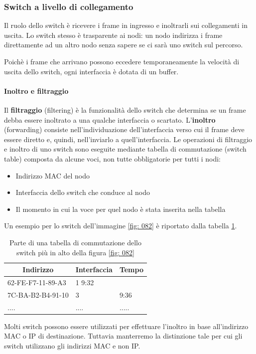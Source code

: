 \documentclass[11pt,a4paper]{article}
\begin{document}
{\subsubsection{Switch a livello di collegamento}
Il ruolo dello switch è ricevere i frame in ingresso e inoltrarli sui collegamenti in uscita. Lo switch stesso è trasparente ai nodi: un nodo indirizza i frame direttamente ad un altro nodo senza sapere se ci sarà uno switch sul percorso.

Poichè i frame che arrivano possono eccedere temporaneamente la velocità di uscita dello switch, ogni interfaccia è dotata di un buffer.

\paragraph{Inoltro e filtraggio}
Il \textbf{filtraggio} (filtering) è la funzionalità dello switch che determina se un frame debba essere inoltrato a una qualche interfaccia o scartato. L'\textbf{inoltro} (forwarding) consiste nell'individuazione dell'interfaccia verso cui il frame deve essere diretto e, quindi, nell'inviarlo a quell'interfaccia. Le operazioni di filtraggio e inoltro di uno switch sono eseguite mediante tabella di commutazione (switch table) composta da alcune voci, non tutte obbligatorie per tutti i nodi:
\begin{itemize}
	\item Indirizzo MAC del nodo
	\item Interfaccia dello switch che conduce al nodo
	\item Il momento in cui la voce per quel nodo è stata inserita nella tabella
\end{itemize}
Un esempio per lo switch dell'immagine \ref{fig: 082} è riportato dalla tabella \ref{tab: 003}.
\begin{table}[]
	\begin{tabular}{|l|l|l|}
		\hline
		\multicolumn{1}{|c|}{\textbf{Indirizzo}} & \multicolumn{1}{c|}{\textbf{Interfaccia}} & \multicolumn{1}{c|}{\textbf{Tempo}} \\ \hline
		62-FE-F7-11-89-A3 				& 1				  9:32				\\ \hline
		7C-BA-B2-B4-91-10				& 3				&9:36				\\ \hline
		....													& ....			& .....				\\ \hline
	\end{tabular}
	\caption{Parte di una tabella di commutazione dello switch più in alto della figura \ref{fig: 082}}
	\label{tab: 003}
\end{table}
Molti switch possono essere utilizzati per effettuare l'inoltro in base all'indirizzo MAC o IP di destinazione. Tuttavia manterremo la distinzione tale per cui gli switch utilizzano gli indirizzi MAC e non IP.

}
\end{document}
